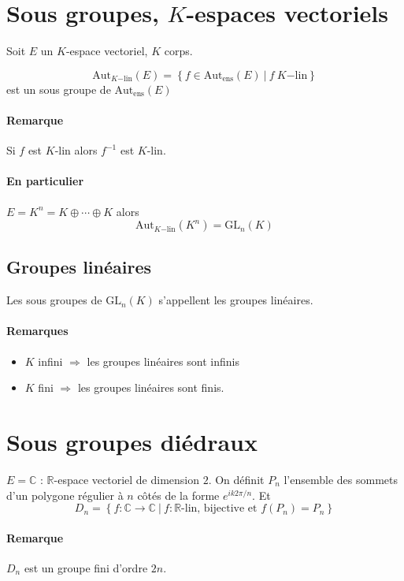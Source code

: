 \documentclass[a4paper,10pt]{report}
\newcommand{\set}[1]{\left\lbrace #1 \right\rbrace } %
\newcommand{\IR}{\mathbb{R}} %
\newcommand{\IC}{\mathbb{C}} %
\newcommand{\so}{\Rightarrow}
\newcommand{\mfootnote}[1]{\up{(}\footnote{#1}\up{)}}
\newcommand{\such}{\ \Big| \ }
\begin{document}
  \section{Sous groupes, $K$-espaces vectoriels}
   Soit $E$ un $K$-espace vectoriel, $K$ corps. 
   \begin{comment}
     \footnote{voir 25/09/08 p1} 
   \end{comment}
   $$\mathrm{Aut}_{K\mathrm{-lin}}(E)=\set{f \in
   \mathrm{Aut}_{\mathrm{ens}}(E) \such f \ K\mathrm{-lin}}$$
   est un sous groupe de $\mathrm{Aut}_{\mathrm{ens}}(E)$
   \paragraph{Remarque} Si $f$ est $K$-lin alors $f^{-1}$ est $K$-lin.
   \paragraph{En particulier} $E=K^n=K \oplus \cdots \oplus K$ alors
    $$\mathrm{Aut}_{K\mathrm{-lin}}(K^n)=\mathrm{GL}_n(K)$$
   \subsection{Groupes linéaires}
    Les sous groupes de $\mathrm{GL}_n(K)$ s'appellent les groupes linéaires.
    \paragraph{Remarques}
    \begin{itemize}
      \item $K$ infini $\so$ les groupes linéaires sont infinis
      \item $K$ fini $\so$ les groupes linéaires sont finis.	
    \end{itemize}
 
  \section{Sous groupes diédraux}
   $E=\IC$ : $\IR$-espace vectoriel de dimension $2$. On définit $P_n$
   l'ensemble des sommets d'un polygone régulier à $n$ côtés de la forme
   $e^{ik2\pi/n}$. Et 
   $$D_n=\set{f : \IC \to \IC \such f: \IR \mbox{-lin, bijective} 
   \mbox{ et } f(P_n) = P_n}$$
   \paragraph{Remarque} $D_n$ est un groupe fini d'ordre $2n$.
   \begin{comment}
     \mfootnote{Preuve 25/09/08 p2} 
   \end{comment}
\end{document}
